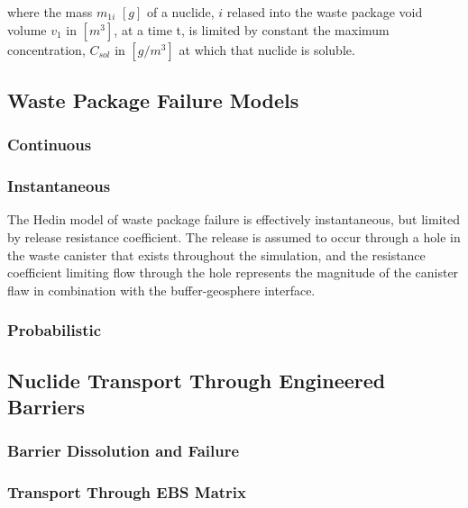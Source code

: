 where the mass $m_{1i}$ $[g]$ of a nuclide, $i$ relased into the waste 
package void volume $v_1$ in $[m^3]$, at a time t, is limited by 
constant the maximum concentration, $C_{sol}$ in $[g/m^3]$ at which 
that nuclide is soluble. \cite{hedin_integrated_2002}


\subsection{Waste Package Failure Models}



\subsubsection{Continuous}

\subsubsection{Instantaneous}
 
The Hedin model of waste package failure is effectively instantaneous, 
but limited by release resistance coefficient. The release is assumed  
to occur through a hole in the waste canister that exists throughout 
the simulation, and the resistance coefficient limiting flow through 
the hole represents the magnitude of the canister flaw in combination
with the buffer-geosphere interface.  \cite{hedin_integrated_2002}

\subsubsection{Probabilistic}


\subsection{Nuclide Transport Through Engineered Barriers}

\subsubsection{Barrier Dissolution and Failure}

\subsubsection{Transport Through EBS Matrix}


